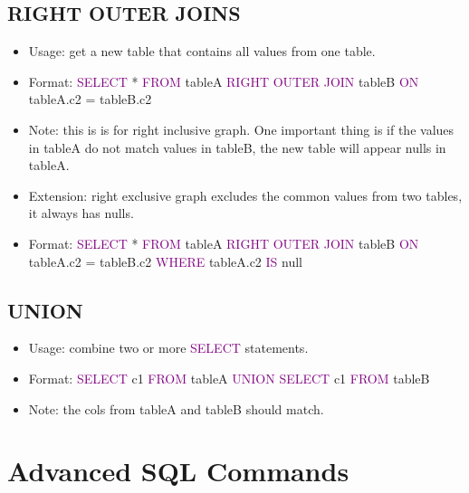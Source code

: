 \documentclass[a4paper]{article}
\begin{document}
\subsection{RIGHT OUTER JOINS}
\begin{itemize}
  \item Usage: get a new table that contains all values from one table.
  \item Format: \textcolor{purple}{SELECT} * \textcolor{purple}{FROM} tableA \textcolor{purple}{RIGHT OUTER JOIN} tableB \textcolor{purple}{ON} tableA.c2 = tableB.c2
  \item Note:  this is is for right inclusive graph. One important thing is if the values in tableA do not match values in tableB, the new table will appear nulls in tableA.
  \item Extension: right exclusive graph excludes the common values from two tables, it always has nulls.
  \item Format: \textcolor{purple}{SELECT} * \textcolor{purple}{FROM} tableA \textcolor{purple}{RIGHT OUTER JOIN} tableB \textcolor{purple}{ON} tableA.c2 = tableB.c2 \textcolor{purple}{WHERE} tableA.c2 \textcolor{purple}{IS} null 
\end{itemize}

\subsection{UNION}
\begin{itemize}
  \item Usage: combine two or more \textcolor{purple}{SELECT} statements.
  \item Format: \textcolor{purple}{SELECT} c1 \textcolor{purple}{FROM} tableA \textcolor{purple}{UNION} \textcolor{purple}{SELECT} c1 \textcolor{purple}{FROM} tableB
  \item Note: the cols from tableA and tableB should match.
\end{itemize}

\section{Advanced SQL Commands}
\end{document}
